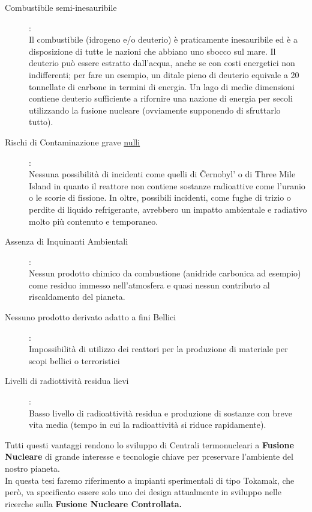 \begin{description}
	\item [Combustibile semi-inesauribile]:\\ 
	Il combustibile (idrogeno e/o deuterio) è praticamente inesauribile ed è a disposizione di tutte le nazioni che abbiano uno sbocco sul mare. Il deuterio può essere estratto dall'acqua, anche se con costi energetici non indifferenti; per fare un esempio, un ditale pieno di deuterio equivale a 20 tonnellate di carbone in termini di energia. Un lago di medie dimensioni contiene deuterio sufficiente a rifornire una nazione di energia per secoli utilizzando la fusione nucleare (ovviamente supponendo di sfruttarlo tutto).
	\item [Rischi di Contaminazione grave \underline{nulli}]:\\
	 Nessuna possibilità di incidenti come quelli di Černobyl' o di Three Mile Island in quanto il reattore non contiene sostanze radioattive come l'uranio o le scorie di fissione. In oltre, possibili incidenti, come fughe di trizio o perdite di liquido refrigerante, avrebbero un impatto ambientale e radiativo molto più contenuto e temporaneo.
	\item [Assenza di Inquinanti Ambientali]:\\
	 Nessun prodotto chimico da combustione (anidride carbonica ad esempio) come residuo immesso nell'atmosfera e quasi nessun contributo al riscaldamento del pianeta.
	\item [Nessuno prodotto derivato adatto a fini Bellici]:\\
	 Impossibilità di utilizzo dei reattori per la produzione di materiale per scopi bellici o terroristici
	\item [Livelli di radiottività residua lievi]:\\
	 Basso livello di radioattività residua e produzione di sostanze con breve vita media (tempo in cui la radioattività si riduce rapidamente).
\end{description}
\noindent
Tutti questi vantaggi rendono lo sviluppo di Centrali termonucleari a \textbf{Fusione Nucleare} di grande interesse e tecnologie chiave per preservare l'ambiente del nostro pianeta.\\
In questa tesi faremo riferimento a impianti sperimentali di tipo Tokamak, che però, va specificato essere solo uno dei design attualmente in sviluppo nelle ricerche sulla \textbf{Fusione Nucleare Controllata.}
\newpage

